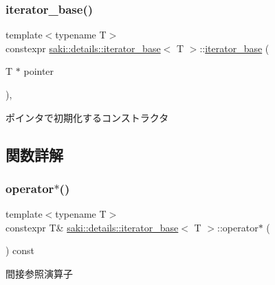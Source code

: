 \subsubsection{\texorpdfstring{iterator\+\_\+base()}{iterator\_base()}}
{\footnotesize\ttfamily template$<$typename T$>$ \\
constexpr \mbox{\hyperlink{classsaki_1_1details_1_1iterator__base}{saki\+::details\+::iterator\+\_\+base}}$<$ T $>$\+::\mbox{\hyperlink{classsaki_1_1details_1_1iterator__base}{iterator\+\_\+base}} (\begin{DoxyParamCaption}\item[{T $\ast$}]{pointer }\end{DoxyParamCaption})\hspace{0.3cm}{\ttfamily [inline]}, {\ttfamily [explicit]}}



ポインタで初期化するコンストラクタ 



\subsection{関数詳解}
\mbox{\label{classsaki_1_1details_1_1iterator__base_a621d7cd415fd0be31f666b54fadaf039}} 
\subsubsection{\texorpdfstring{operator$\ast$()}{operator*()}}
{\footnotesize\ttfamily template$<$typename T$>$ \\
constexpr T\& \mbox{\hyperlink{classsaki_1_1details_1_1iterator__base}{saki\+::details\+::iterator\+\_\+base}}$<$ T $>$\+::operator$\ast$ (\begin{DoxyParamCaption}{ }\end{DoxyParamCaption}) const\hspace{0.3cm}{\ttfamily [inline]}}



間接参照演算子 

\mbox{\label{classsaki_1_1details_1_1iterator__base_a1539e90e42dd7208401df3ad5f6385b1}} 
